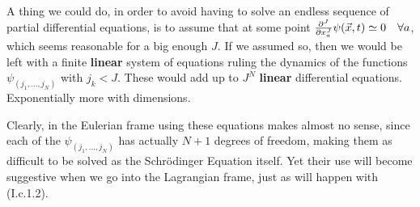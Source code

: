 \documentclass[11pt, a4paper]{article} %
\begin{document}
A thing we could do, in order to avoid having to solve an endless sequence of partial differential equations, is to assume that at some point $\pdv[J]{}{x_a}\psi(\vec{x},t)\simeq 0\quad \forall a$, which seems reasonable for a big enough $J$. If we assumed so, then we would be left with a finite {\bf linear} system of equations ruling the dynamics of the functions $\psi_{(j_1,...,j_N)}$ with $j_k<J$. These would add up to $J^N$ {\bf linear} differential equations. Exponentially more with dimensions.

Clearly, in the Eulerian frame using these equations makes almost no sense, since each of the $\psi_{(j_1,...,j_N)}$ has actually $N+1$ degrees of freedom, making them as difficult to be solved as the Schrödinger Equation itself. Yet their use will become suggestive when we go into the Lagrangian frame, just as will happen with (I.c.1.2).\vspace{-0.3cm}
\end{document}
